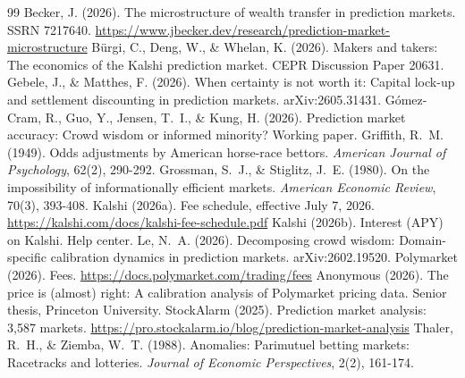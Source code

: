 \documentclass[11pt]{article}
\begin{document}
\vspace{4pt}

\begin{thebibliography}{99}\small
{} Becker, J. (2026). The microstructure of wealth transfer in prediction markets. SSRN 7217640. \url{https://www.jbecker.dev/research/prediction-market-microstructure}
 B\"urgi, C., Deng, W., \& Whelan, K. (2026). Makers and takers: The economics of the Kalshi prediction market. CEPR Discussion Paper 20631.
 Gebele, J., \& Matthes, F. (2026). When certainty is not worth it: Capital lock-up and settlement discounting in prediction markets. arXiv:2605.31431.
 G\'omez-Cram, R., Guo, Y., Jensen, T.~I., \& Kung, H. (2026). Prediction market accuracy: Crowd wisdom or informed minority? Working paper.
 Griffith, R.~M. (1949). Odds adjustments by American horse-race bettors. \textit{American Journal of Psychology}, 62(2), 290-292.
 Grossman, S.~J., \& Stiglitz, J.~E. (1980). On the impossibility of informationally efficient markets. \textit{American Economic Review}, 70(3), 393-408.
 Kalshi (2026a). Fee schedule, effective July 7, 2026. \url{https://kalshi.com/docs/kalshi-fee-schedule.pdf}
 Kalshi (2026b). Interest (APY) on Kalshi. Help center.
 Le, N.~A. (2026). Decomposing crowd wisdom: Domain-specific calibration dynamics in prediction markets. arXiv:2602.19520.
 Polymarket (2026). Fees. \url{https://docs.polymarket.com/trading/fees}
 Anonymous (2026). The price is (almost) right: A calibration analysis of Polymarket pricing data. Senior thesis, Princeton University.
 StockAlarm (2025). Prediction market analysis: 3,587 markets. \url{https://pro.stockalarm.io/blog/prediction-market-analysis}
 Thaler, R.~H., \& Ziemba, W.~T. (1988). Anomalies: Parimutuel betting markets: Racetracks and lotteries. \textit{Journal of Economic Perspectives}, 2(2), 161-174.
\end{thebibliography}
\end{document}
